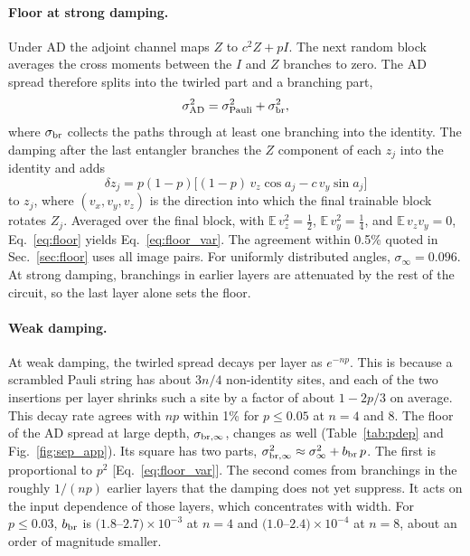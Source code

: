 \documentclass[
 aps,pra,
 twocolumn,
 superscriptaddress,
 longbibliography,
 nofootinbib
]{revtex4-2}
\newcommand{\AD}{\mathrm{AD}}
\begin{document}
\paragraph{Floor at strong damping.}
Under AD the adjoint channel maps $Z$ to $c^2Z+pI$. The next random block
averages the cross moments between the $I$ and $Z$ branches to zero. The AD
spread therefore splits into the twirled part and a branching part,
\begin{equation}
\sigma_{\AD}^2=\sigma_{\rm Pauli}^2+\sigma_{\rm br}^2 ,
\label{eq:split}
\end{equation}
where $\sigma_{\rm br}$ collects the paths through at least one branching into
the identity. The damping after the last entangler branches the $Z$ component
of each $z_j$ into the identity and adds
\begin{equation}
\delta z_j=p(1-p)\bigl[(1-p)\,v_z\cos a_j-c\,v_y\sin a_j\bigr]
\label{eq:floor}
\end{equation}
to $z_j$, where $(v_x,v_y,v_z)$ is the direction into which the final
trainable block rotates $Z_j$. Averaged over the final block, with
$\mathbb E\,v_z^2=\frac12$, $\mathbb E\,v_y^2=\frac14$, and
$\mathbb E\,v_zv_y=0$, Eq.~\eqref{eq:floor} yields Eq.~\eqref{eq:floor_var}.
The agreement within 0.5\% quoted in Sec.~\ref{sec:floor} uses all image
pairs. For uniformly distributed angles, $\sigma_\infty=0.096$. At strong
damping, branchings in earlier layers are attenuated by the rest of the
circuit, so the last layer alone sets the floor.

\paragraph{Weak damping.}
At weak damping, the twirled spread decays per layer as $e^{-np}$. This is
because a scrambled Pauli string has about $3n/4$ non-identity sites, and each
of the two insertions per layer shrinks such a site by a factor of about
$1-2p/3$ on average. This decay rate agrees with $np$ within 1\% for
$p\le0.05$ at $n=4$ and 8. The floor of the AD spread at large depth,
$\sigma_{\rm br,\infty}$, changes as well (Table~\ref{tab:pdep} and
Fig.~\ref{fig:sep_app}). Its square has two parts,
$\sigma_{\rm br,\infty}^2\approx\sigma_\infty^2+b_{\rm br}\,p$. The first is
proportional to $p^2$ [Eq.~\eqref{eq:floor_var}]. The second comes from
branchings in the roughly $1/(np)$ earlier layers that the damping does not yet
suppress. It acts on the input dependence of those layers, which concentrates
with width. For $p\le0.03$, $b_{\rm br}$ is
$(1.8$--$2.7)\times10^{-3}$ at $n=4$ and $(1.0$--$2.4)\times10^{-4}$ at
$n=8$, about an order of magnitude smaller.
\end{document}
